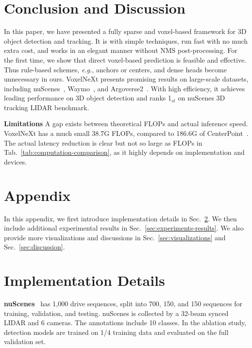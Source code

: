 \documentclass[10pt,twocolumn,letterpaper]{article}
\begin{document}
\section{Conclusion and Discussion}
\label{sec:conclusion}
In this paper, we have presented a fully sparse and voxel-based framework for 3D object detection and tracking. It is with simple techniques, run fast with no much extra cost, and works in an elegant manner without NMS post-processing. For the first time, we show that direct voxel-based prediction is feasible and effective. Thus rule-based schemes, {\em e.g.}, anchors or centers, and dense heads become unnecessary in ours. VoxelNeXt presents promising results on large-scale datasets, including nuScenes~\cite{nuscenes}, Waymo~\cite{waymo}, and Argoverse2~\cite{argo2}. With high efficiency, it achieves leading performance on 3D object detection and ranks 1$_{st}$ on nuScenes 3D tracking LIDAR benchmark.

\vspace{0.35em}
\noindent
\textbf{Limitations}
A gap exists between theoretical FLOPs and actual inference speed.
VoxelNeXt has a much small 38.7G FLOPs, compared to 186.6G of CenterPoint~\cite{centerpoint}. The actual latency reduction is clear but not so large as FLOPs in Tab.~\ref{tab:computation-comparison}, as it highly depends on implementation and devices.

{\small


}


\appendix
{}

\section*{Appendix}
In this appendix, we first introduce implementation details in Sec.~\ref{sec:implementation-details}. We then include additional experimental results in Sec.~\ref{sec:experiments-results}. We also provide more visualizations and discussions in Sec.~\ref{sec:visualizations} and Sec.~\ref{sec:discussion}. 

\section{Implementation Details}
\label{sec:implementation-details}

\noindent
\textbf{nuScenes}~\cite{nuscenes} has 1,000 drive sequences, split into 700, 150, and 150 sequences for training, validation, and testing. nuScenes is collected by a 32-beam synced LIDAR and 6 cameras. The annotations include 10 classes. In the ablation study, detection models are trained on 1/4 training data and evaluated on the full validation set. 
\end{document}

